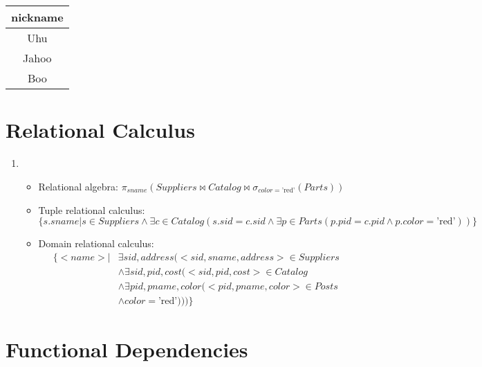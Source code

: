 \subsection{~}

\begin{tabular}{| c |}
\hline 
\textbf{nickname}\\
\hline
Uhu\\
\hline
Jahoo\\
\hline 
Boo\\
\hline
\end{tabular}

\section{Relational Calculus}
{
\newcommand{\solution}[3]{
\item
\begin{itemize}
\item Relational algebra: #1
\item Tuple relational calculus: #2
\item Domain relational calculus: #3
\end{itemize}}
\begin{enumerate}
\solution
{$\pi_{sname}(Suppliers \Join Catalog \Join \sigma_{color=\text{'red'}}(Parts))$}
{$
\{s.sname | s \in Suppliers\wedge \exists c \in Catalog(s.sid = c.sid \wedge \exists p \in Parts(p.pid = c.pid \wedge p.color = \text{'red'}) ) \}
$}
{
\begin{align*}
\{<name> | &\exists sid,address(<sid, sname, address> \in Suppliers\\
&\wedge \exists sid,pid,cost(<sid,pid, cost> \in Catalog\\
&\wedge \exists pid, pname, color(<pid,pname,color> \in Posts\\
&\wedge color=\text{'red'}
))) \}
\end{align*}
}
\end{enumerate}
}
\section{Functional Dependencies}
